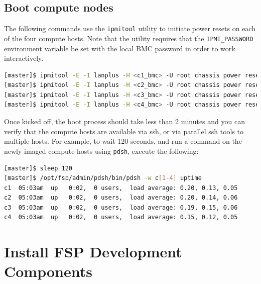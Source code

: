 \documentclass[letterpaper]{article}
\begin{document}




\subsection{Boot compute nodes}

 
The following commands use the \texttt{ipmitool} utility to initiate power
resets on each of the four compute hosts. Note that the utility requires that
the \texttt{IPMI\_PASSWORD} environment variable be set with the local BMC password in
order to work interactively.


\begin{lstlisting}[language=bash,keywords={},upquote=true]
[master]$ ipmitool -E -I lanplus -H <c1_bmc> -U root chassis power reset   # power cycle c1
[master]$ ipmitool -E -I lanplus -H <c2_bmc> -U root chassis power reset   # power cycle c2
[master]$ ipmitool -E -I lanplus -H <c3_bmc> -U root chassis power reset   # power cycle c3
[master]$ ipmitool -E -I lanplus -H <c4_bmc> -U root chassis power reset   # power cycle c4
\end{lstlisting} 


Once kicked off, the boot process should take less than 2 minutes and you can
verify that the compute hosts are available via ssh, or via parallel ssh tools to multiple
hosts. For example, to wait 120 seconds, and run a command on the newly imaged
compute hosts using \texttt{pdsh}, execute the following:

\begin{lstlisting}[language=bash]
[master]$ sleep 120
[master]$ /opt/fsp/admin/pdsh/bin/pdsh -w c[1-4] uptime
c1  05:03am  up   0:02,  0 users,  load average: 0.20, 0.13, 0.05
c2  05:03am  up   0:02,  0 users,  load average: 0.20, 0.14, 0.06
c3  05:03am  up   0:02,  0 users,  load average: 0.19, 0.15, 0.06
c4  05:03am  up   0:02,  0 users,  load average: 0.15, 0.12, 0.05
\end{lstlisting}



\section{Install FSP Development Components}
\end{document}
